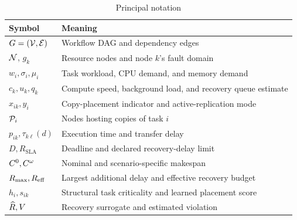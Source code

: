 \begin{table}[!t]
\caption{Principal notation}
\label{tab:notation}
\centering
\footnotesize
\begin{tabular}{@{}p{}p{}@{}}
\toprule
Symbol & Meaning \\
\midrule
$G=(\mathcal{V},\mathcal{E})$ & Workflow DAG and dependency edges \\
$\mathcal{N}$, $g_k$ & Resource nodes and node $k$'s fault domain \\
$w_i,\sigma_i,\mu_i$ & Task workload, CPU demand, and memory demand \\
$c_k,u_k,q_k$ & Compute speed, background load, and recovery queue estimate \\
$x_{ik},y_i$ & Copy-placement indicator and active-replication mode \\
$\mathcal{P}_{i}$ & Nodes hosting copies of task $i$ \\
$p_{ik},\tau_{k\ell}(d)$ & Execution time and transfer delay \\
$D,R_{\mathrm{SLA}}$ & Deadline and declared recovery-delay limit \\
$C^{0},C^{\omega}$ & Nominal and scenario-specific makespan \\
$R_{\max},R_{\mathrm{eff}}$ & Largest additional delay and effective recovery budget \\
$h_i,s_{ik}$ & Structural task criticality and learned placement score \\
$\widehat{R},V$ & Recovery surrogate and estimated violation \\
\bottomrule
\end{tabular}
\end{table}
